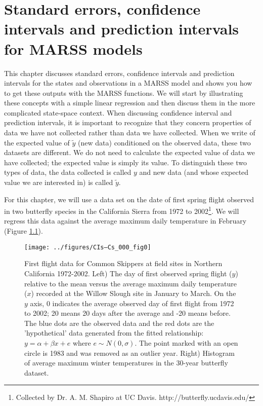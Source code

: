 

\chapter{Standard errors, confidence intervals and prediction intervals for MARSS models}
\label{chap:cis}


This chapter discusses standard errors, confidence intervals and prediction intervals for the states and observations in a MARSS model and shows you how to get these outputs with the MARSS functions.  We will start by illustrating these concepts with a simple linear regression and then discuss them in the more complicated state-space context.  When discussing confidence interval and prediction intervals, it is important to recognize that they concern properties of data we have not collected rather than data we have collected.  When we write of the expected value of $\tilde{y}$ (new data) conditioned on the observed data, these two datasets are different.  We do not need to calculate the expected value of data we have collected; the expected value is simply its value.  To distinguish these two types of data, the data collected is called $y$ and new data (and whose expected value we are interested in) is called $\tilde{y}$.

For this chapter, we will use a data set on the date of first spring flight observed in two butterfly species in the California Sierra from 1972 to 2002\footnote{Collected by Dr. A. M. Shapiro at UC Davis.  http://butterfly.ucdavis.edu/}.
We will regress this data against the average maximum daily temperature in February (Figure \ref{fig:dat}).
\begin{figure}[htp]\label{fig:dat}
\begin{center}
\texttt{[image: ../figures/CIs--Cs\_000\_fig0]}
\end{center}
\caption{First flight data for Common Skippers at field sites in Northern California 1972-2002.  Left) The day of first observed spring flight ($y$) relative to the mean versus the average maximum daily temperature ($x$) recorded at the Willow Slough site in January to March.  On the $y$ axis, 0 indicates the average observed day of first flight from 1972 to 2002; 20 means 20 days after the average and -20 means before.  The blue dots are the observed data and the red dots are the 'hypothetical' data generated from the fitted relationship: $y=\alpha+\beta x + e$ where $e \sim N(0,\sigma)$. The point marked with an open circle is 1983 and was removed as an outlier year. Right) Histogram of average maximum winter temperatures in the 30-year butterfly dataset.}
\end{figure}

